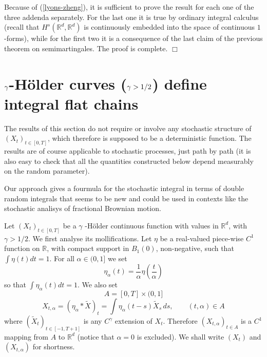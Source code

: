 \documentclass{article}
\newenvironment{proof}[1][Proof]{{\sc #1.} }{\hfill $\Box$}
\begin{document}
\begin{proof}
Because of (\ref{lyons-zheng}), it is sufficient to prove the result for
each one of the three addenda separately. For the last one it is true by
ordinary integral calculus (recall that $H^{s}\left( \mathbb{R}^{d},\mathbb{R%
}^{d}\right) $ is continuously embedded into the space of continuous $1$%
-forms), while for the first two it is a consequence of the last claim of
the previous theorem on semimartingales. The proof is complete.
\end{proof}

\section{$\protect\gamma $-H\"{o}lder curves ($\protect\gamma >1/2$) define integral flat chains}

The results of this section do not require or involve any stochastic
structure of $\left( X_{t}\right) _{t\in \left[ 0,T\right] }$, which
therefore is supposed to be a deterministic function. The results are of
course applicable to stochastic processes, just path by path (it is also
easy to check that all the quantities constructed below depend measurably on
the random parameter).

Our approach gives a fourmula for the stochastic integral in terms of
double random integrals that seems to be new and could be used in
contexts like the stochastic analisys of fractional Brownian motion.

Let $\left( X_{t}\right) _{t\in \left[ 0,T\right] }$ be a $\gamma $%
-H\"{o}lder continuous function with values in $\mathbb{R}^{d}$, with $\gamma
>1/2$. We first analyse its mollifications. Let $\eta $ be a
real-valued piece-wise $C^{1}$ function on $\mathbb{R}$, with compact
support in $B_{1}\left( 0\right) $, non-negative, such that $\int \eta
\left( t\right) dt=1$. For all $\alpha \in (0,1]$ we set 
\begin{equation*}
\eta _{\alpha }\left( t\right) =\frac{1}{\alpha }\eta \left( \frac{t}{\alpha 
}\right)
\end{equation*}
so that $\int \eta _{\alpha }\left( t\right) dt=1$. We also set 
\begin{equation*}
A=\left[ 0,T\right] \times (0,1]
\end{equation*}
\begin{equation*}
X_{t,\alpha }=( \eta _{\alpha }\ast \tilde{X}) _{t}=\int \eta
_{\alpha }\left( t-s\right) \tilde{X}_{s}\,ds,\qquad \left( t,\alpha \right)
\in A
\end{equation*}
where $( \tilde{X}_{t} ) _{t\in \left[ -1,T+1\right] }$ is any $%
C^{\gamma }$ extension of $X_{t}$. Therefore $\left( X_{t,\alpha }\right)
_{t\in A}$ is a $C^{1}$ mapping from $A$ to $\mathbb{R}^{d}$ (notice that $%
\alpha =0$ is excluded). We shall write $\left( X_{t}\right) $ and $\left(
X_{t,\alpha }\right) $ for shortness.
\end{document}
